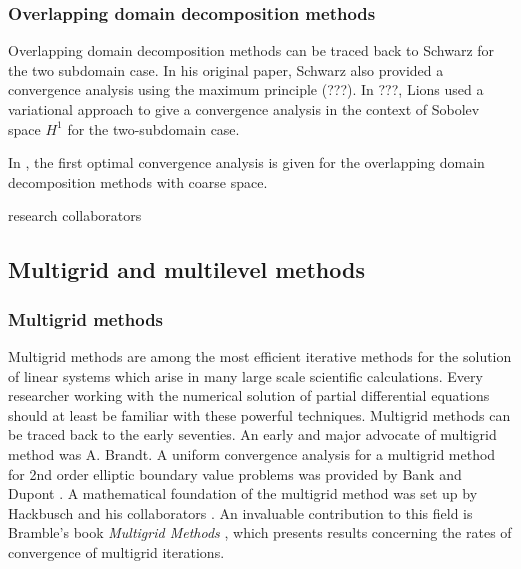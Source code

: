 \documentclass[CJK,11pt]{amsart}
\theoremstyle{definition}
\begin{document}
\begin{CJK*}{UTF8}{gbsn}
\subsubsection{Overlapping domain decomposition methods}
Overlapping domain decomposition methods can be traced back to Schwarz
\cite{} for the two subdomain case.  In his original paper, Schwarz
also provided a convergence analysis using the maximum principle (???).
In ???, Lions used a variational approach to give a convergence
analysis in the context of Sobolev space $H^1$ for the two-subdomain
case.


In \cite{bramble1991convergence-b}, the first optimal convergence
analysis is given for the overlapping domain decomposition methods
with coarse space.

 {\color{red} research collaborators}

\subsection{Multigrid and multilevel methods}

\subsubsection{Multigrid methods}  Multigrid methods are among the most efficient iterative methods for
the solution of linear systems which arise in many large scale
scientific calculations. Every researcher working with the numerical
solution of partial differential equations should at least be familiar
with these powerful techniques. Multigrid methods can be traced back to
the early seventies.  An early and major advocate of multigrid
method was A. Brandt.   A uniform convergence analysis for
a multigrid method for 2nd order elliptic boundary value problems was
provided by Bank and Dupont \cite{}.  A mathematical foundation of the multigrid method
was set up by Hackbusch and his collaborators \cite{}. An invaluable contribution
to this field is Bramble's book {\it Multigrid Methods} \cite{bramble2019multigrid}, which 
presents results concerning the rates of convergence of multigrid iterations.


\end{CJK*}
\end{document}
